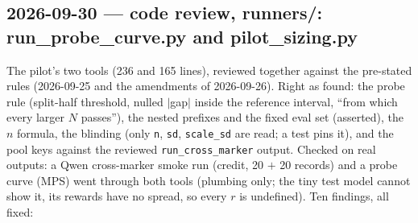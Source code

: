 \documentclass{article}
\begin{document}
\subsection*{2026-09-30 --- code review, runners/: run\_probe\_curve.py and pilot\_sizing.py}
The pilot's two tools (236 and 165 lines), reviewed together against the pre-stated rules (2026-09-25 and the
amendments of 2026-09-26). Right as found: the probe rule (split-half threshold, nulled $|$gap$|$ inside the
reference interval, ``from which every larger $N$ passes''), the nested prefixes and the fixed eval set (asserted),
the $n$ formula, the blinding (only \texttt{n}, \texttt{sd}, \texttt{scale\_sd} are read; a test pins it), and the
pool keys against the reviewed \texttt{run\_cross\_marker} output. Checked on real outputs: a Qwen cross-marker smoke
run (credit, 20 $+$ 20 records) and a probe curve (MPS) went through both tools (plumbing only; the tiny test model
cannot show it, its rewards have no spread, so every $r$ is undefined). Ten findings, all fixed:
\end{document}
